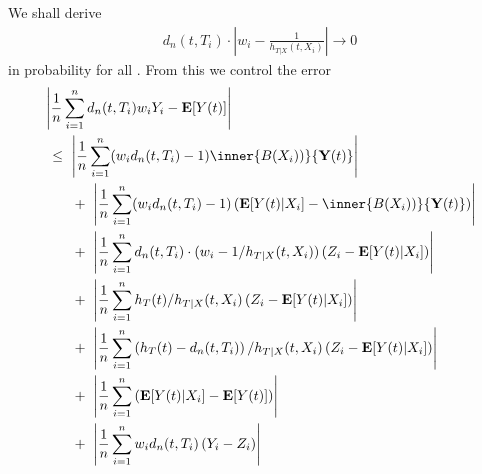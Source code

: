 \pagebreak
We shall derive
\begin{gather}
  d_n(t,T_i)
  \cdot
  \left| 
  w_i
  -
  \frac{1}{h_{T|X}(t,X_i)}
  \right|
  \to 0
\end{gather}
in probability for all 
.
From this we control the error
\begin{align*}
  &\left| 
  \frac{1}{n}
  \sum_{i=1}^{n} 
  d_n(t,T_i)
  w_i
  Y_i
  -
  \E[Y(t)]
  \right|
  \\
  &
  \ 
  \le
  \ 
  \left|  
  \frac{1}{n}
    \sum_{i=1}^{n} 
    (
    w_i 
  d_n(t,T_i)
    -
    1
    )
    \inner
    {B(X_i))}
    { \mathbf{Y}(t) }
  \right|
  \\
  &
  \qquad
  +
  \ 
  \left|  
  \frac{1}{n}
    \sum_{i=1}^{n} 
    (
    w_i 
  d_n(t,T_i)
    -
    1
    )
    \left( 
    \E[Y(t)| X_i]
    -
    \inner
    {B(X_i))}
    { \mathbf{Y}(t) }
    \right)
  \right|
  \\
  &
  \qquad
  +
  \ 
  \left|  
  \frac{1}{n}
    \sum_{i=1}^{n} 
  d_n(t,T_i)
    \cdot
    (
    w_i 
    -
    1/
h_{T|X}(t,X_i)
    )
    \left( 
      Z_i
    -
    \E[Y(t)| X_i]
    \right)
  \right|
  \\
  &
  \qquad
  +
  \ 
  \left|  
  \frac{1}{n}
    \sum_{i=1}^{n} 
h_{T}(t)
    /
h_{T|X}(t,X_i)
    \left( 
      Z_i
    -
    \E[Y(t)| X_i]
    \right)
  \right|
  \\
  &
  \qquad
  +
  \ 
  \left|  
  \frac{1}{n}
    \sum_{i=1}^{n} 
    \left( 
h_{T}(t)
-
  d_n(t,T_i)
    \right)
    /
h_{T|X}(t,X_i)
    \left( 
      Z_i
    -
    \E[Y(t)| X_i]
    \right)
  \right|
  \\
  &
  \qquad
  +
  \ 
  \left|  
  \frac{1}{n}
    \sum_{i=1}^{n} 
    \left( 
    \E[Y(t)| X_i]
    -
    \E[Y(t)]
    \right)
  \right|
  \\
  &
  \qquad
  +
  \ 
  \left|  
  \frac{1}{n}
    \sum_{i=1}^{n} 
    w_i 
d_n(t,T_i)
    \left( 
      Y_i
    -
    Z_i
    \right)
  \right|
\end{align*}
